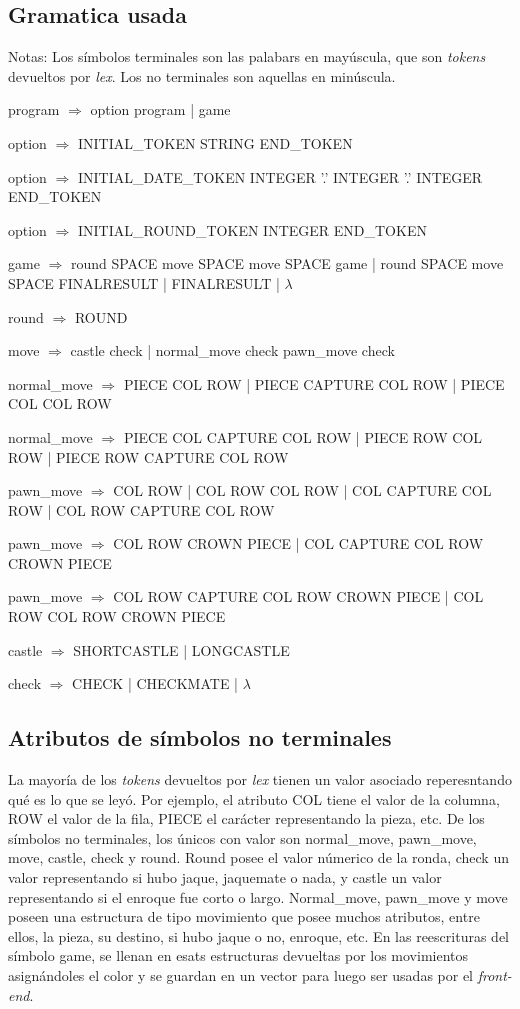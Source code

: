 \documentclass[a4paper,10pt]{article}
\begin{document}
\subsection{Gramatica usada}

Notas: Los símbolos terminales son las palabars en mayúscula, que son \textit{tokens} devueltos por \textit{lex}. Los no terminales 
son aquellas en minúscula.

program $\Rightarrow$ option program | game 

option $\Rightarrow$ INITIAL_TOKEN STRING END_TOKEN  

option $\Rightarrow$ INITIAL_DATE_TOKEN INTEGER '.' INTEGER '.' INTEGER END_TOKEN 

option $\Rightarrow$ INITIAL_ROUND_TOKEN INTEGER END_TOKEN 

game $\Rightarrow$ round SPACE move SPACE move SPACE game | round SPACE move SPACE FINALRESULT | FINALRESULT | $\lambda$

round $\Rightarrow$ ROUND               

move $\Rightarrow$  castle check | normal_move check pawn_move   check 

normal_move $\Rightarrow$ PIECE COL ROW | PIECE CAPTURE COL ROW | PIECE COL COL ROW         

normal_move $\Rightarrow$ PIECE COL CAPTURE COL ROW | PIECE ROW COL ROW | PIECE ROW CAPTURE COL ROW 

pawn_move $\Rightarrow$ COL ROW | COL ROW COL ROW | COL CAPTURE COL ROW  | COL ROW CAPTURE COL ROW      
       
pawn_move $\Rightarrow$ COL ROW CROWN PIECE | COL CAPTURE COL ROW CROWN PIECE     

pawn_move $\Rightarrow$ COL ROW CAPTURE COL ROW CROWN PIECE | COL ROW COL ROW CROWN PIECE         

castle $\Rightarrow$ SHORTCASTLE   | LONGCASTLE   

check $\Rightarrow$ CHECK  | CHECKMATE  | $\lambda$

\subsection{Atributos de símbolos no terminales }

La mayoría de los \textit{tokens} devueltos por \textit{lex} tienen un valor asociado reperesntando qué es lo que se leyó. Por ejemplo, 
el atributo COL tiene el valor de la columna, ROW el valor de la fila, PIECE el carácter representando la pieza, etc.
De los símbolos no terminales, los únicos con valor son normal_move, pawn_move, move, castle, check y round. Round posee el valor númerico de la ronda, 
check un valor representando si hubo jaque, jaquemate o nada, y castle un valor representando si el enroque fue corto o largo. Normal_move, pawn_move 
y move poseen una estructura de tipo movimiento que posee muchos atributos, entre ellos, la pieza, su destino, si hubo jaque o no, enroque, etc. En las 
reescrituras del símbolo game, se llenan en esats estructuras devueltas por los movimientos asignándoles el color y se guardan en un vector para luego 
ser usadas por el \textit{front-end}.
\end{document}
